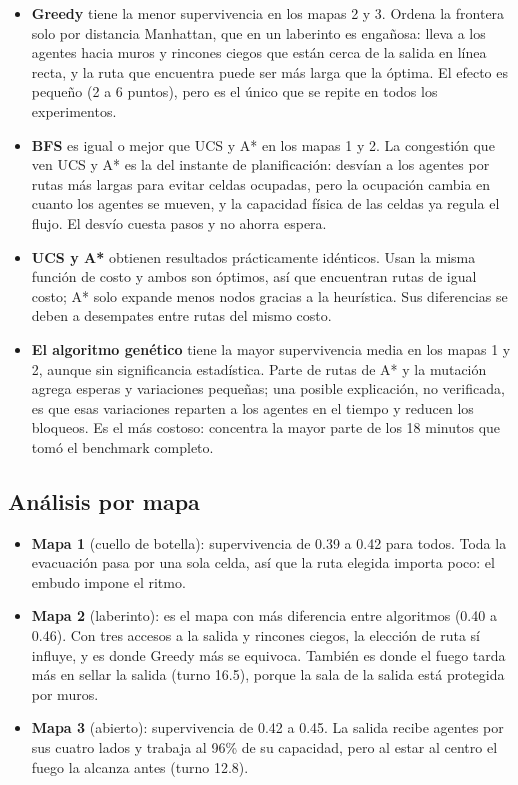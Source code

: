 \documentclass[11pt,a4paper]{article}
\begin{document}
\begin{itemize}
  \item \textbf{Greedy} tiene la menor supervivencia en los mapas 2 y 3. Ordena la frontera solo por distancia Manhattan, que en un laberinto es engañosa: lleva a los agentes hacia muros y rincones ciegos que están cerca de la salida en línea recta, y la ruta que encuentra puede ser más larga que la óptima. El efecto es pequeño (2 a 6 puntos), pero es el único que se repite en todos los experimentos.
  \item \textbf{BFS} es igual o mejor que UCS y A* en los mapas 1 y 2. La congestión que ven UCS y A* es la del instante de planificación: desvían a los agentes por rutas más largas para evitar celdas ocupadas, pero la ocupación cambia en cuanto los agentes se mueven, y la capacidad física de las celdas ya regula el flujo. El desvío cuesta pasos y no ahorra espera.
  \item \textbf{UCS y A*} obtienen resultados prácticamente idénticos. Usan la misma función de costo y ambos son óptimos, así que encuentran rutas de igual costo; A* solo expande menos nodos gracias a la heurística. Sus diferencias se deben a desempates entre rutas del mismo costo.
  \item \textbf{El algoritmo genético} tiene la mayor supervivencia media en los mapas 1 y 2, aunque sin significancia estadística. Parte de rutas de A* y la mutación agrega esperas y variaciones pequeñas; una posible explicación, no verificada, es que esas variaciones reparten a los agentes en el tiempo y reducen los bloqueos. Es el más costoso: concentra la mayor parte de los 18 minutos que tomó el benchmark completo.
\end{itemize}

\subsection{Análisis por mapa}

\begin{itemize}
  \item \textbf{Mapa 1} (cuello de botella): supervivencia de 0.39 a 0.42 para todos. Toda la evacuación pasa por una sola celda, así que la ruta elegida importa poco: el embudo impone el ritmo.
  \item \textbf{Mapa 2} (laberinto): es el mapa con más diferencia entre algoritmos (0.40 a 0.46). Con tres accesos a la salida y rincones ciegos, la elección de ruta sí influye, y es donde Greedy más se equivoca. También es donde el fuego tarda más en sellar la salida (turno 16.5), porque la sala de la salida está protegida por muros.
  \item \textbf{Mapa 3} (abierto): supervivencia de 0.42 a 0.45. La salida recibe agentes por sus cuatro lados y trabaja al 96\% de su capacidad, pero al estar al centro el fuego la alcanza antes (turno 12.8).
\end{itemize}
\end{document}
